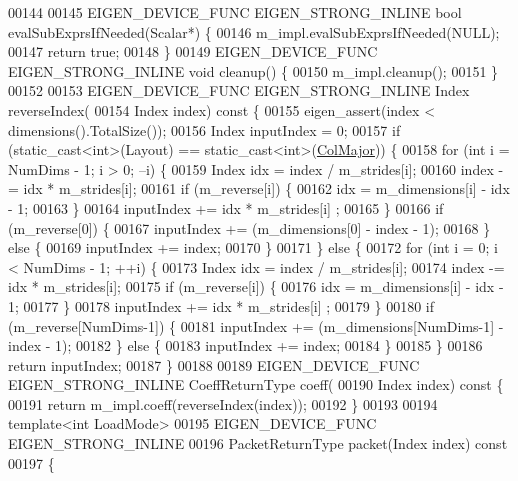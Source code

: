\begin{DoxyCode}
00144 
00145   EIGEN\_DEVICE\_FUNC EIGEN\_STRONG\_INLINE \textcolor{keywordtype}{bool} evalSubExprsIfNeeded(Scalar*) \{
00146     m\_impl.evalSubExprsIfNeeded(NULL);
00147     \textcolor{keywordflow}{return} \textcolor{keyword}{true};
00148   \}
00149   EIGEN\_DEVICE\_FUNC EIGEN\_STRONG\_INLINE \textcolor{keywordtype}{void} cleanup() \{
00150     m\_impl.cleanup();
00151   \}
00152 
00153   EIGEN\_DEVICE\_FUNC EIGEN\_STRONG\_INLINE Index reverseIndex(
00154       Index index)\textcolor{keyword}{ const }\{
00155     eigen\_assert(index < dimensions().TotalSize());
00156     Index inputIndex = 0;
00157     \textcolor{keywordflow}{if} (static\_cast<int>(Layout) == static\_cast<int>(\hyperlink{group__enums_ggaacded1a18ae58b0f554751f6cdf9eb13a0cbd4bdd0abcfc0224c5fcb5e4f6669a}{ColMajor})) \{
00158       \textcolor{keywordflow}{for} (\textcolor{keywordtype}{int} i = NumDims - 1; i > 0; --i) \{
00159         Index idx = index / m\_strides[i];
00160         index -= idx * m\_strides[i];
00161         \textcolor{keywordflow}{if} (m\_reverse[i]) \{
00162           idx = m\_dimensions[i] - idx - 1;
00163         \}
00164         inputIndex += idx * m\_strides[i] ;
00165       \}
00166       \textcolor{keywordflow}{if} (m\_reverse[0]) \{
00167         inputIndex += (m\_dimensions[0] - index - 1);
00168       \} \textcolor{keywordflow}{else} \{
00169         inputIndex += index;
00170       \}
00171     \} \textcolor{keywordflow}{else} \{
00172       \textcolor{keywordflow}{for} (\textcolor{keywordtype}{int} i = 0; i < NumDims - 1; ++i) \{
00173         Index idx = index / m\_strides[i];
00174         index -= idx * m\_strides[i];
00175         \textcolor{keywordflow}{if} (m\_reverse[i]) \{
00176           idx = m\_dimensions[i] - idx - 1;
00177         \}
00178         inputIndex += idx * m\_strides[i] ;
00179       \}
00180       \textcolor{keywordflow}{if} (m\_reverse[NumDims-1]) \{
00181         inputIndex += (m\_dimensions[NumDims-1] - index - 1);
00182       \} \textcolor{keywordflow}{else} \{
00183         inputIndex += index;
00184       \}
00185     \}
00186     \textcolor{keywordflow}{return} inputIndex;
00187   \}
00188 
00189   EIGEN\_DEVICE\_FUNC EIGEN\_STRONG\_INLINE CoeffReturnType coeff(
00190       Index index)\textcolor{keyword}{ const  }\{
00191     \textcolor{keywordflow}{return} m\_impl.coeff(reverseIndex(index));
00192   \}
00193 
00194   \textcolor{keyword}{template}<\textcolor{keywordtype}{int} LoadMode>
00195   EIGEN\_DEVICE\_FUNC EIGEN\_STRONG\_INLINE
00196   PacketReturnType packet(Index index)\textcolor{keyword}{ const}
00197 \textcolor{keyword}{  }\{

\end{DoxyCode}
